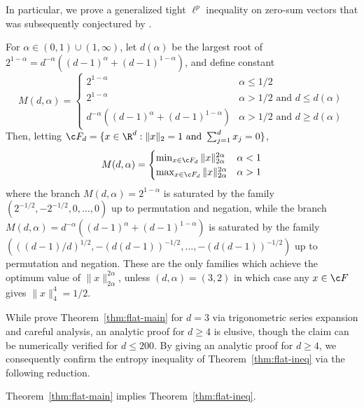 \documentclass[11pt]{article}
\begin{document}
In particular, we prove a generalized tight $\ell^p$ inequality on zero-sum vectors that was subsequently conjectured by \citep{holevo2026conjecturetightnorminequality}. 
\begin{theorem}\label{thm:flat-main}
    For $\alpha\in (0,1)\cup(1,\infty)$, let $d(\alpha)$ be the largest root of $2^{1-\alpha}=d^{-\alpha}((d-1)^\alpha+(d-1)^{1-\alpha})$, and define constant 
    $$M(d,\alpha)=\begin{cases}
        2^{1-\alpha}&\alpha \leq 1/2\\
        2^{1-\alpha}& \alpha > 1/2\text{ and }d\leq d(\alpha)\\
        d^{-\alpha}((d-1)^\alpha+(d-1)^{1-\alpha}) & \alpha > 1/2 \text{ and }d\geq d(\alpha) 
    \end{cases}$$
    Then, letting $\c F_d =\{x\in \R^d: \|x\|_2=1\text{ and } \sum_{j=1}^{d}x_j=0\}$,
    $$M(d,\alpha)=\begin{cases}
        \min_{x\in \c F_d}\|x\|_{2\alpha}^{2\alpha}& \alpha < 1\\
        \max_{x\in \c F_d}\|x\|_{2\alpha}^{2\alpha}& \alpha > 1
    \end{cases}$$
    where the branch $M(d,\alpha)=2^{1-\alpha}$ is saturated by the family $(2^{-1/2},-2^{-1/2},0,\dots,0)$ up to permutation and negation, while the branch $M(d,\alpha)=d^{-\alpha}((d-1)^{\alpha}+(d-1)^{1-\alpha})$ is saturated by the family 
    $(((d-1)/d)^{1/2},-(d(d-1))^{-1/2},\dots,-(d(d-1))^{-1/2})$ up to permutation and negation. These are the only families which achieve the optimum value of $\|x\|_{2\alpha}^{2\alpha}$, unless $(d,\alpha)=(3,2)$ in which case any $x\in \c F $ gives $\|x\|_4^4=1/2$.
\end{theorem}
While \citep{holevo2026conjecturetightnorminequality} prove Theorem~\ref{thm:flat-main} for $d=3$ via trigonometric series expansion and careful analysis, an analytic proof for $d\geq 4$ is elusive, though the claim can be numerically verified for $d\leq 200$. By giving an analytic proof for $d\geq 4$, we consequently confirm the entropy inequality of Theorem~\ref{thm:flat-ineq} via the following reduction.
\begin{proposition}
    Theorem~\ref{thm:flat-main} implies Theorem~\ref{thm:flat-ineq}.
\end{proposition}
\end{document}

